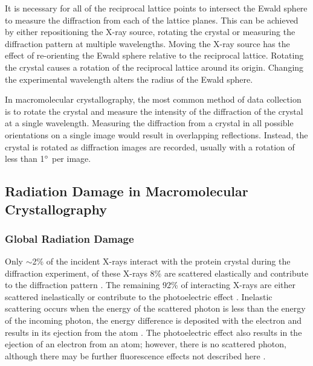 It is necessary for all of the reciprocal lattice points to intersect the Ewald sphere to measure the diffraction from each of the lattice planes. This can be achieved by either repositioning the X-ray source, rotating the crystal or measuring the diffraction pattern at multiple wavelengths. Moving the X-ray source has the effect of re-orienting the Ewald sphere relative to the reciprocal lattice. Rotating the crystal causes a rotation of the reciprocal lattice around its origin. Changing the experimental wavelength alters the radius of the Ewald sphere.       

In macromolecular crystallography, the most common method of data collection is to rotate the crystal and measure the intensity of the diffraction of the crystal at a single wavelength. Measuring the diffraction from a crystal in all possible orientations on a single image would result in overlapping reflections. Instead, the crystal is rotated as diffraction images are recorded, usually with a rotation of less than 1$\degree$ per image.





\clearpage
\subsection{Radiation Damage in Macromolecular Crystallography}\label{sec:damage}
\subsubsection{Global Radiation Damage}
Only $\sim$2\% of the incident X-rays interact with the protein crystal during the diffraction experiment, of these X-rays 8\% are scattered elastically and contribute to the diffraction pattern \cite{Ravelli2006}. The remaining 92\% of interacting X-rays are either scattered inelastically or contribute to the photoelectric effect \cite{Ravelli2006}. Inelastic scattering occurs when the energy of the scattered photon is less than the energy of the incoming photon, the energy difference is deposited with the electron and results in its ejection from the atom \cite{Nave1995}. The photoelectric effect also results in the ejection of an electron from an atom; however, there is no scattered photon, although there may be further fluorescence effects not described here \cite{Nave1995}. \par

